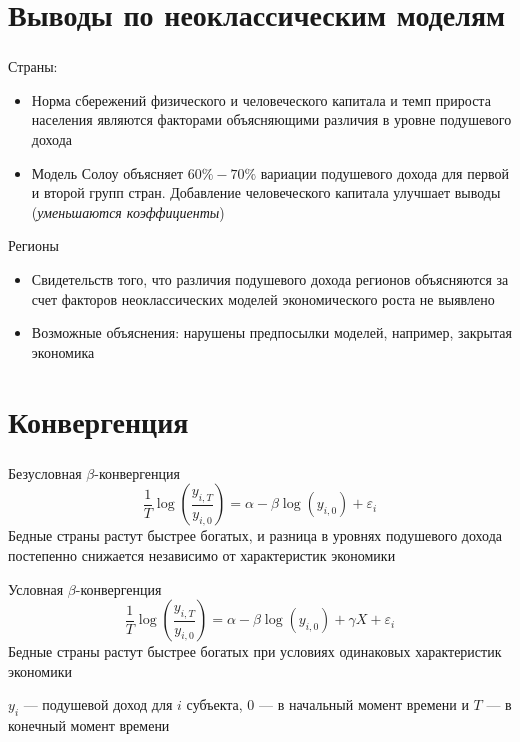 \documentclass[c, dvipsnames]{beamer}  %
\begin{document}
\section{Выводы по неоклассическим моделям}
\begin{frame}
	\frametitle{\insertsection}
	Страны:
	\begin{itemize}
		\item Норма сбережений физического и человеческого капитала и темп прироста населения являются факторами объясняющими различия в уровне подушевого дохода 
		\item Модель Солоу объясняет $60\%-70\%$ вариации подушевого дохода для первой и второй групп стран. Добавление человеческого капитала улучшает выводы (\textit{уменьшаются коэффициенты})
	\end{itemize}	
	Регионы 
	\begin{itemize}
		\item Свидетельств  того, что различия подушевого дохода регионов объясняются за счет факторов неоклассических моделей экономического роста не выявлено
		\item Возможные объяснения: нарушены предпосылки моделей, например, закрытая экономика 
	\end{itemize}
\end{frame}
 
\section{Конвергенция}


\begin{frame}
\frametitle{\insertsection} 
 
\begin{block}{Безусловная $\beta$-конвергенция }
 \begin{equation}
\dfrac{1}{T}\log(\dfrac{y_{i,T}}{y_{i,0}})=\alpha-\beta \log(y_{i,0})+\varepsilon_{i}
 \end{equation} 
 Бедные страны растут быстрее богатых, и разница в уровнях подушевого дохода постепенно снижается независимо от  характеристик экономики
 \end{block}
 \begin{block}{Условная $\beta$-конвергенция}
  \begin{equation}
\dfrac{1}{T}\log(\dfrac{y_{i,T}}{y_{i,0}})=\alpha-\beta \log(y_{i,0})+\gamma X+ \varepsilon_{i}
 \end{equation} 
 Бедные страны растут быстрее богатых при условиях одинаковых характеристик экономики 
  \end{block}
  
  $y_i$ --- подушевой доход для $i$ субъекта,  $0$ --- в начальный момент времени и $T$ --- в конечный момент времени


\end{frame}
\end{document}
